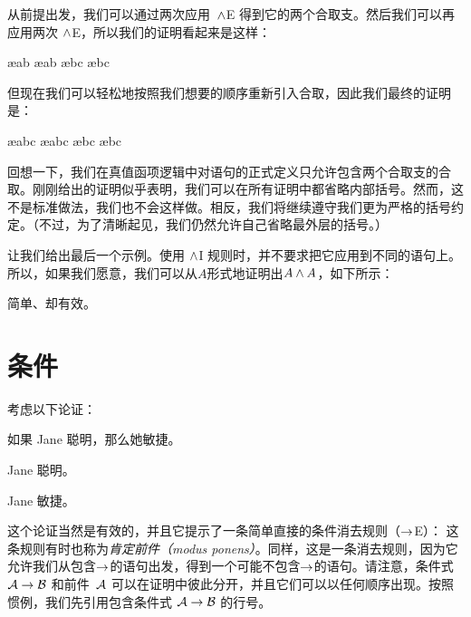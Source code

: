 从前提出发，我们可以通过两次应用~$\wedge$E 得到它的两个合取支。然后我们可以再应用两次 $\wedge$E，所以我们的证明看起来是这样：


\begin{fitchproof}
	\PR
	 \ae{ab}
	 \ae{ab}
	 \ae{bc}
	 \ae{bc}
\end{fitchproof}


但现在我们可以轻松地按照我们想要的顺序重新引入合取，因此我们最终的证明是：

\begin{fitchproof}
    \PR
     \ae{abc}
     \ae{abc}
     \ae{bc}
     \ae{bc}
\end{fitchproof}


回想一下，我们在真值函项逻辑中对语句的正式定义只允许包含两个合取支的合取。刚刚给出的证明似乎表明，我们可以在所有证明中都省略内部括号。然而，这不是标准做法，我们也不会这样做。相反，我们将继续遵守我们更为严格的括号约定。（不过，为了清晰起见，我们仍然允许自己省略最外层的括号。）

让我们给出最后一个示例。使用 $\wedge$I 规则时，并不要求把它应用到不同的语句上。所以，如果我们愿意，我们可以从$A$形式地证明出$A \wedge A$，如下所示：

\begin{fitchproof}
    \PR
\end{fitchproof}

简单、却有效。

\section{条件}
考虑以下论证：


\begin{earg}
        \item[] 如果 Jane 聪明，那么她敏捷。
        \item[] Jane 聪明。
        \item[\texttherefore] Jane 敏捷。
\end{earg}


这个论证当然是有效的，并且它提示了一条简单直接的条件消去规则（$\rightarrow$E）：
这条规则有时也称为\emph{肯定前件（modus ponens）}。同样，这是一条消去规则，因为它允许我们从包含$\rightarrow$的语句出发，得到一个可能不包含$\rightarrow$的语句。请注意，条件式 $\mathcal{A}\rightarrow\mathcal{B}$ 和前件~$\mathcal{A}$ 可以在证明中彼此分开，并且它们可以以任何顺序出现。按照惯例，我们先引用包含条件式 $\mathcal{A}\rightarrow\mathcal{B}$ 的行号。

